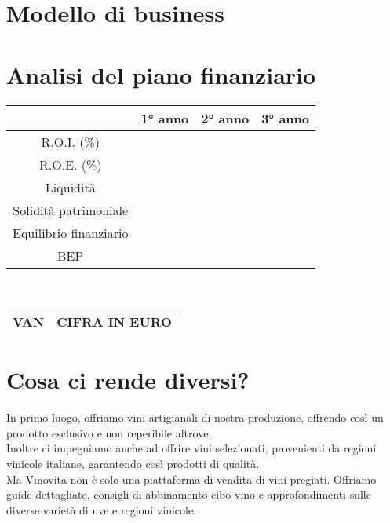 \documentclass[12pt, a4paper]{article}
\newcommand{\meskip}{\medskip \\}
\begin{document}
\section*{Modello di business}

\section*{Analisi del piano finanziario}
\begin{tabular}{|c|c|c|c|}
    \hline
                           & 1° anno & 2° anno & 3° anno \\ \hline
    R.O.I. (\%)            &         &         &         \\ \hline
    R.O.E. (\%)            &         &         &         \\ \hline
    Liquidità              &         &         &         \\ \hline
    Solidità patrimoniale  &         &         &         \\ \hline
    Equilibrio finanziario &         &         &         \\ \hline
    BEP                    &         &         &         \\ \hline
\end{tabular}\meskip
\begin{tabular}{|c|l|}
    \hline
    VAN & CIFRA IN EURO \\ \hline
    \end{tabular}
\section*{Cosa ci rende diversi?}
In primo luogo, offriamo vini artigianali di nostra produzione, offrendo così un prodotto esclusivo e non reperibile altrove.\\
Inoltre ci impegniamo anche ad offrire vini selezionati, provenienti da regioni vinicole italiane, garantendo così prodotti di qualità.\meskip
Ma Vinovita non è solo una piattaforma di vendita di vini pregiati.
Offriamo guide dettagliate, consigli di abbinamento cibo-vino e approfondimenti sulle diverse varietà di uve e regioni vinicole.
\end{document}
